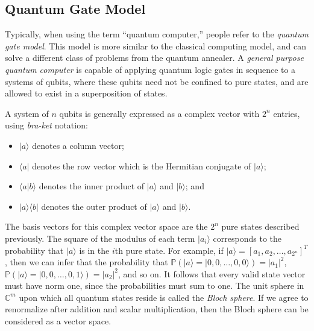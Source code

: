 \documentclass[12pt]{article}
\begin{document}
\subsection*{Quantum Gate Model}

Typically, when using the term ``quantum computer,'' people refer to
the {\it quantum gate model}.
This model is more similar to the classical computing model, and can
solve a different class of problems from the quantum annealer.
A {\it general purpose quantum computer} is capable of applying quantum
logic gates in sequence to a systems of qubits, where these qubits
need not be confined to pure states, and are allowed to exist
in a superposition of states.

A system of $n$ qubits is generally expressed as a complex vector with
$2^n$ entries, using {\it bra-ket} notation:
\begin{itemize}
\item $| a \rangle$ denotes a column vector;
\item $\langle a |$ denotes the row vector which is the Hermitian
conjugate of $| a \rangle$;
\item $\langle a | b \rangle$ denotes the inner product of $|a\rangle$
and $|b\rangle$; and
\item $|a\rangle \langle b|$ denotes the outer product of $|a\rangle$
and $|b\rangle$.
\end{itemize}

The basis vectors for this complex vector space are the $2^n$ pure states
described previously.
The square of the modulus of each term $|a_i\rangle$ corresponds
to the probability that $|a\rangle$ is in the $i$th pure state.
For example, if $|a\rangle = [a_1, a_2, \ldots, a_{2^n}]^T$, then we
can infer that the probability that 
$\mathbb{P}\left(|a\rangle = |0,0,\ldots,0,0\rangle\right) = |a_1|^2$,
$\mathbb{P}\left(|a\rangle = |0,0,\ldots,0,1\rangle\right) = |a_2|^2$,
and so on.
It follows that every valid state vector must have norm one, since
the probabilities must sum to one.
The unit sphere in $\mathbb{C}^m$ upon which all quantum states reside
is called the {\it Bloch sphere}.
If we agree to renormalize after addition and scalar multiplication,
then the Bloch sphere can be considered as a vector space.
\end{document}
